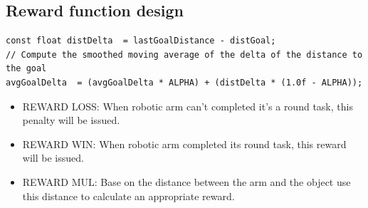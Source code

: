 \documentclass[10pt,journal,compsoc]{IEEEtran}
\begin{document}
\subsection{Reward function design}

\begin{lstlisting}
const float distDelta  = lastGoalDistance - distGoal;
// Compute the smoothed moving average of the delta of the distance to the goal
avgGoalDelta  = (avgGoalDelta * ALPHA) + (distDelta * (1.0f - ALPHA));
\end{lstlisting}

\begin{itemize}
\item REWARD LOSS: When robotic arm can't completed it's a round task, this penalty will be issued.
\item REWARD WIN: When robotic arm completed its round task, this reward will be issued.
\item REWARD MUL: Base on the distance between the arm and the object use this distance to calculate an appropriate reward.
\end {itemize}
\end{document}
